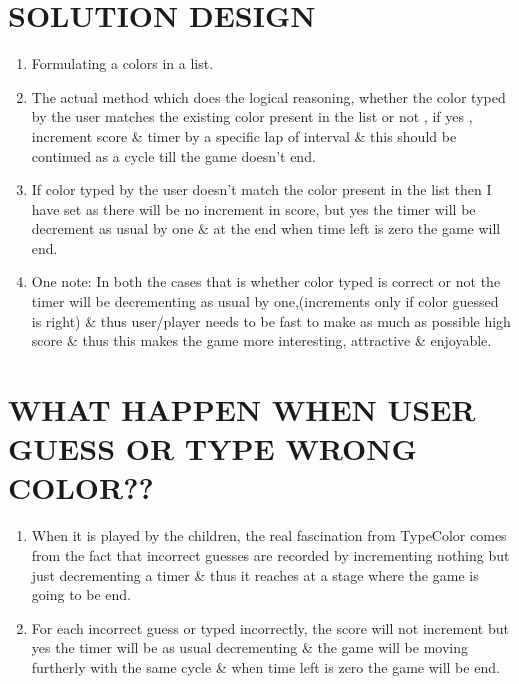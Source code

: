 \documentclass[12pt]{article}
\begin{document}
\section{SOLUTION DESIGN}
\begin{enumerate}
	
	\item Formulating a colors in a list.
	
	\item The actual method which does the logical reasoning, whether the color typed by the user matches the existing color present in the list or not , if yes , increment score \& timer by a specific lap of interval \& this should be continued as a cycle till the game doesn't end.
	
	\item If color typed by the user doesn't match the color present in the list then I have set as there will be no increment in score, but yes the timer will be decrement as usual by one \& at the end when time left is zero the game will end.
	
	\item One note: In both the cases that is whether color typed is correct or not the timer will be decrementing as usual by one,(increments only if color guessed is right) \& thus user/player needs to be fast to make as much as possible high score \& thus this makes the game more interesting, attractive \& enjoyable.  
\end{enumerate}

\section{WHAT HAPPEN WHEN USER GUESS OR TYPE WRONG COLOR??}
\begin{enumerate}
	\item When it is played by the children, the real fascination  from TypeColor comes from the fact that incorrect guesses are recorded by incrementing nothing but just decrementing a timer \& thus it reaches at a stage where the game is going to be end.
	
	\item For each incorrect guess or typed incorrectly, the score will not increment but yes the timer will be as usual decrementing \& the game will be moving furtherly with the same cycle \& when time left is zero the game will be end. 
\end{enumerate}
\end{document}
